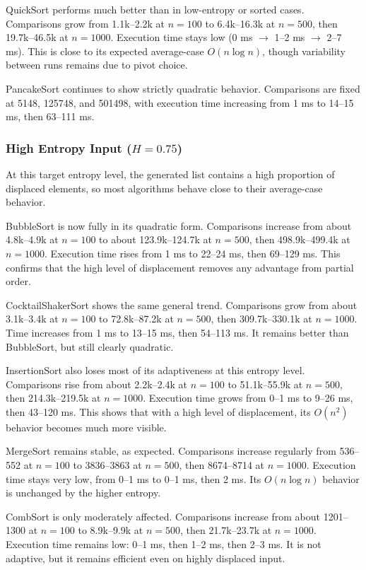 \documentclass{article}
\begin{document}
QuickSort performs much better than in low-entropy or sorted cases. Comparisons grow from 1.1k--2.2k at $n=100$ to 6.4k--16.3k at $n=500$, then 19.7k--46.5k at $n=1000$. Execution time stays low (0 ms $\rightarrow$ 1--2 ms $\rightarrow$ 2--7 ms). This is close to its expected average-case $O(n \log n)$, though variability between runs remains due to pivot choice.

PancakeSort continues to show strictly quadratic behavior. Comparisons are fixed at 5148, 125748, and 501498, with execution time increasing from 1 ms to 14--15 ms, then 63--111 ms.


\subsubsection{High Entropy Input ($H = 0.75$)}

At this target entropy level, the generated list contains a high proportion of displaced elements, so most algorithms behave close to their average-case behavior.

BubbleSort is now fully in its quadratic form. Comparisons increase from about 4.8k--4.9k at $n=100$ to about 123.9k--124.7k at $n=500$, then 498.9k--499.4k at $n=1000$. Execution time rises from 1 ms to 22--24 ms, then 69--129 ms. This confirms that the high level of displacement removes any advantage from partial order.

CocktailShakerSort shows the same general trend. Comparisons grow from about 3.1k--3.4k at $n=100$ to 72.8k--87.2k at $n=500$, then 309.7k--330.1k at $n=1000$. Time increases from 1 ms to 13--15 ms, then 54--113 ms. It remains better than BubbleSort, but still clearly quadratic.

InsertionSort also loses most of its adaptiveness at this entropy level. Comparisons rise from about 2.2k--2.4k at $n=100$ to 51.1k--55.9k at $n=500$, then 214.3k--219.5k at $n=1000$. Execution time grows from 0--1 ms to 9--26 ms, then 43--120 ms. This shows that with a high level of displacement, its $O(n^2)$ behavior becomes much more visible.

MergeSort remains stable, as expected. Comparisons increase regularly from 536--552 at $n=100$ to 3836--3863 at $n=500$, then 8674--8714 at $n=1000$. Execution time stays very low, from 0--1 ms to 0--1 ms, then 2 ms. Its $O(n \log n)$ behavior is unchanged by the higher entropy.

CombSort is only moderately affected. Comparisons increase from about 1201--1300 at $n=100$ to 8.9k--9.9k at $n=500$, then 21.7k--23.7k at $n=1000$. Execution time remains low: 0--1 ms, then 1--2 ms, then 2--3 ms. It is not adaptive, but it remains efficient even on highly displaced input.
\end{document}
